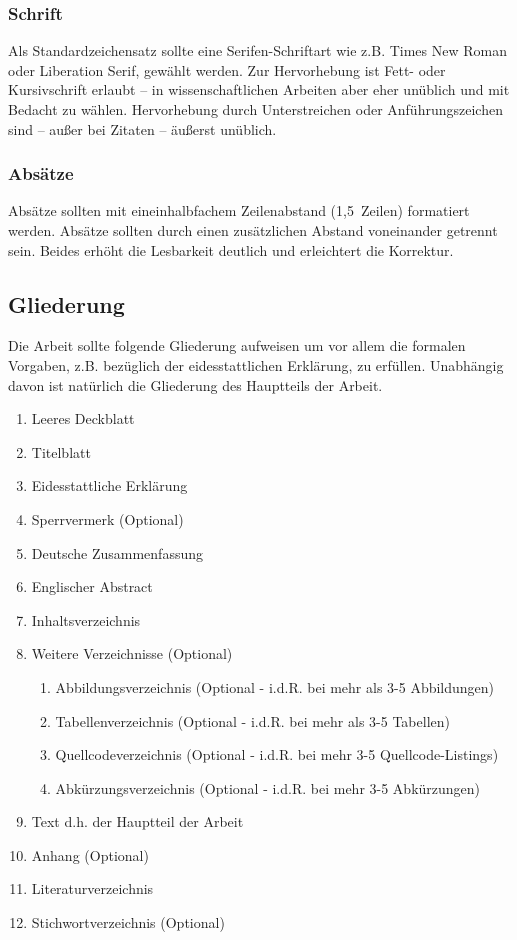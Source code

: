\subsubsection{Schrift}\label{sec:structure:layout:fonts}
%
Als Standardzeichensatz sollte eine Serifen-Schriftart wie z.B. Times New Roman oder Liberation Serif, gewählt werden. Zur Hervorhebung ist Fett- oder Kursivschrift erlaubt – in wissenschaftlichen Arbeiten aber eher unüblich und mit Bedacht zu wählen. Hervorhebung durch Unterstreichen oder Anführungszeichen sind -- außer bei Zitaten -- äußerst unüblich.

\subsubsection{Absätze}\label{sec:structure:layout:paragraphs}
%
Absätze sollten mit eineinhalbfachem Zeilenabstand (1,5~Zeilen) formatiert werden. Absätze sollten durch einen zusätzlichen Abstand voneinander getrennt sein. Beides erhöht die Lesbarkeit deutlich und erleichtert die Korrektur.

\subsection{Gliederung}\label{sec:structure:structure}
%
Die Arbeit sollte folgende Gliederung aufweisen um vor allem die formalen Vorgaben, z.B. bezüglich der eidesstattlichen Erklärung, zu erfüllen. Unabhängig davon ist natürlich die Gliederung des Hauptteils der Arbeit.

\begin{enumerate}
  \item Leeres Deckblatt
  \item Titelblatt
  \item Eidesstattliche Erklärung
  \item Sperrvermerk (Optional)
  \item Deutsche Zusammenfassung
  \item Englischer Abstract
  \item Inhaltsverzeichnis
  \item Weitere Verzeichnisse (Optional)
  \begin{enumerate}
    \item Abbildungsverzeichnis (Optional - i.d.R. bei mehr als 3-5 Abbildungen)
    \item Tabellenverzeichnis (Optional - i.d.R. bei mehr als 3-5 Tabellen)
    \item Quellcodeverzeichnis (Optional - i.d.R. bei mehr 3-5 Quellcode-Listings)
    \item Abkürzungsverzeichnis (Optional - i.d.R. bei mehr 3-5 Abkürzungen)
  \end{enumerate}
  \item Text d.h. der Hauptteil der Arbeit
  \item Anhang (Optional)
  \item Literaturverzeichnis
  \item Stichwortverzeichnis (Optional)
\end{enumerate}
\smallskip

